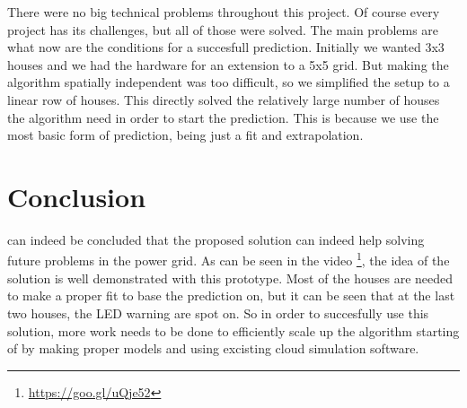 \documentclass[a4paper,journal]{DDREAM}
\begin{document}
There were no big technical problems throughout this project.
Of course every project has its challenges, but all of those were solved.
The main problems are what now are the conditions for a succesfull prediction.
Initially we wanted 3x3 houses and we had the hardware for an extension to a 5x5 grid.
But making the algorithm spatially independent was too difficult, so we simplified the setup to a linear row of houses.
This directly solved the relatively large number of houses the algorithm need in order to start the prediction.
This is because we use the most basic form of prediction, being just a fit and extrapolation.

\section{Conclusion}\label{sec:conclusion}
 can indeed be concluded that the proposed solution can indeed help solving future problems in the power grid.
As can be seen in the video \footnote{\url{https://goo.gl/uQje52}}, the idea of the solution is well demonstrated with this prototype.
Most of the houses are needed to make a proper fit to base the prediction on, but it can be seen that at the last two houses, the LED warning are spot on.
So in order to succesfully use this solution, more work needs to be done to efficiently scale up the algorithm starting of by making proper models and using excisting cloud simulation software.





\ifCLASSOPTIONcaptionsoff
  \newpage
\fi

\end{document}
